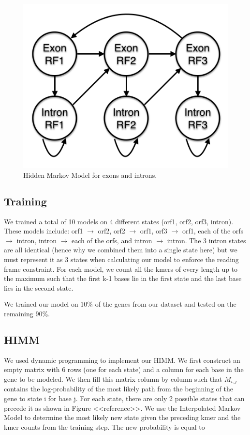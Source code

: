 \documentclass[11pt,letterpaper]{article}
\begin{document}
\begin{figure}
	\begin{center}
		\includegraphics[scale=0.4]{HMM.png}
	\end{center}
	\caption{\label{font-table} Hidden Markov Model for exons and introns.}
\end{figure}

\subsection{Training}
We trained a total of 10 models on 4 different states (orf1, orf2, orf3, intron). These models include: orf1 $\rightarrow$ orf2, orf2 $\rightarrow$ orf1, orf3 $\rightarrow$ orf1, each of the orfs  $\rightarrow$  intron, intron  $\rightarrow$ each of the orfs, and intron  $\rightarrow$  intron. The 3 intron states are all identical (hence why we combined them into a single state here) but we must represent it as 3 states when calculating our model to enforce the reading frame constraint. For each model, we count all the kmers of every length up to the maximum such that the first k-1 bases lie in the first state and the last base lies in the second state.

We trained our model on 10\% of the genes from our dataset and tested on the remaining 90\%.

\subsection{HIMM}
We used dynamic programming to implement our HIMM. We first construct an empty matrix with 6 rows (one for each state) and a column for each base in the gene to be modeled. We then fill this matrix column by column such that $M_{i,j}$ contains the log-probability of the most likely path from the beginning of the gene to state i for base j. For each state, there are only 2 possible states that can precede it as shown in Figure <<reference>>. We use the Interpolated Markov Model to determine the most likely new state given the preceding kmer and the kmer counts from the training step. The new probability is equal to
\end{document}
